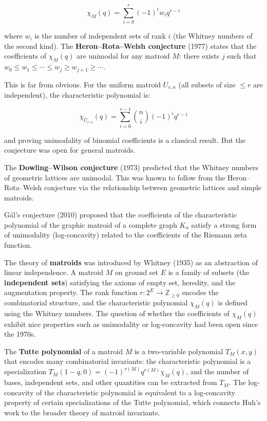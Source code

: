 \[
\chi_M(q) = \sum_{i=0}^r (-1)^i w_i q^{r-i}
\]

where $w_i$ is the number of independent sets of rank $i$ (the Whitney numbers of the second kind). The \textbf{Heron--Rota--Welsh conjecture} (1977) states that the coefficients of $\chi_M(q)$ are unimodal for any matroid $M$: there exists $j$ such that $w_0 \le w_1 \le \cdots \le w_j \ge w_{j+1} \ge \cdots$.

This is far from obvious. For the uniform matroid $U_{r,n}$ (all subsets of size $\le r$ are independent), the characteristic polynomial is:

\[
\chi_{U_{r,n}}(q) = \sum_{i=0}^{r-1} \binom{n}{i}(-1)^i q^{r-i}
\]

and proving unimodality of binomial coefficients is a classical result. But the conjecture was open for general matroids.

The \textbf{Dowling--Wilson conjecture} (1973) predicted that the Whitney numbers of geometric lattices are unimodal. This was known to follow from the Heron--Rota--Welsh conjecture via the relationship between geometric lattices and simple matroids.

G\'al's conjecture (2010) proposed that the coefficients of the characteristic polynomial of the graphic matroid of a complete graph $K_n$ satisfy a strong form of unimodality (log-concavity) related to the coefficients of the Riemann zeta function.

The theory of \textbf{matroids} was introduced by Whitney (1935) as an abstraction of linear independence. A matroid $M$ on ground set $E$ is a family of subsets (the \textbf{independent sets}) satisfying the axioms of empty set, heredity, and the augmentation property. The rank function $r: 2^E \to \mathbb{Z}_{\ge 0}$ encodes the combinatorial structure, and the characteristic polynomial $\chi_M(q)$ is defined using the Whitney numbers. The question of whether the coefficients of $\chi_M(q)$ exhibit nice properties such as unimodality or log-concavity had been open since the 1970s.

The \textbf{Tutte polynomial} of a matroid $M$ is a two-variable polynomial $T_M(x,y)$ that encodes many combinatorial invariants: the characteristic polynomial is a specialization $T_M(1-q, 0) = (-1)^{r(M)} q^{r(M)} \chi_M(q)$, and the number of bases, independent sets, and other quantities can be extracted from $T_M$. The log-concavity of the characteristic polynomial is equivalent to a log-concavity property of certain specializations of the Tutte polynomial, which connects Huh's work \cite{huh2015} to the broader theory of matroid invariants.

